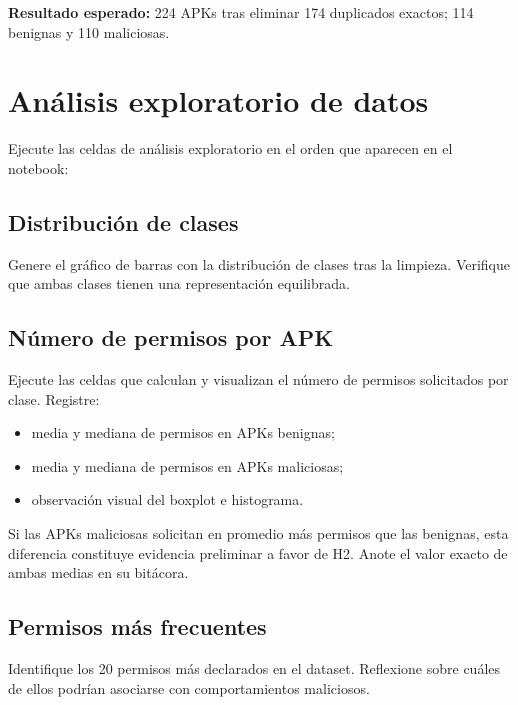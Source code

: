 \documentclass[
  coursetitle={Cómputo Nube y Tecnologías Emergentes},
  coursehours={96},
  coursedate={Verano 2026},
  doctype={Taller},
  otherlangs={english,french},
  authorname={Lázaro},
  authorsurname={Bustio-Martínez},
  authortitle={PhD},
  role={Profesor Investigador},
  email={lbustio@inaoe.mx},
  phone={5559504000},
  ext={7459},
  institution={Instituto Nacional de Astrofísica, Óptica y Electrónica (INAOE)},
  department={Maestría en Ciencias en Tecnologías de Seguridad},
  address={Luis Enrique Erro 1, Sta. Ma. Tonantzintla, San Andrés Cholula, CP 72840, Puebla, México},
  margin={0.5in}
]{../../lbustio_lecture_notes}
\begin{document}
\begin{tcolorbox}[title=Punto de control 3]
\textbf{Resultado esperado:} 224 APKs tras eliminar 174 duplicados exactos; 114 benignas y 110 maliciosas.
\end{tcolorbox}

\section{Análisis exploratorio de datos}

Ejecute las celdas de análisis exploratorio en el orden que aparecen en el notebook:

\subsection{Distribución de clases}

Genere el gráfico de barras con la distribución de clases tras la limpieza. Verifique que ambas clases tienen una representación equilibrada.

\subsection{Número de permisos por APK}

Ejecute las celdas que calculan y visualizan el número de permisos solicitados por clase. Registre:

\begin{itemize}
    \item media y mediana de permisos en APKs benignas;
    \item media y mediana de permisos en APKs maliciosas;
    \item observación visual del boxplot e histograma.
\end{itemize}

\begin{tcolorbox}[title=Evidencia para H2]
Si las APKs maliciosas solicitan en promedio más permisos que las benignas, esta diferencia constituye evidencia preliminar a favor de H2. Anote el valor exacto de ambas medias en su bitácora.
\end{tcolorbox}

\subsection{Permisos más frecuentes}

Identifique los 20 permisos más declarados en el dataset. Reflexione sobre cuáles de ellos podrían asociarse con comportamientos maliciosos.
\end{document}
